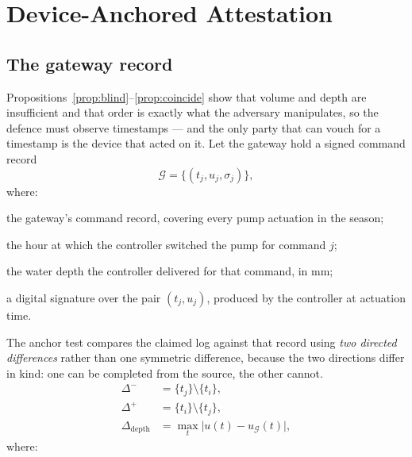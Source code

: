 \section{Device-Anchored Attestation}
\label{sec:anchor}

\subsection{The gateway record}

Propositions~\ref{prop:blind}--\ref{prop:coincide} show that volume and depth
are insufficient and that order is exactly what the adversary manipulates, so
the defence must observe timestamps --- and the only party that can vouch for
a timestamp is the device that acted on it. Let the gateway hold a signed
command record
\begin{equation}
\mathcal{G}=\{(t_j,u_j,\sigma_j)\},
\label{eq:gateway}
\end{equation}
where:
\begin{symbolist}
\item[$\mathcal{G}$] the gateway's command record, covering every pump actuation in the season;
\item[$t_j$] the hour at which the controller switched the pump for command $j$;
\item[$u_j$] the water depth the controller delivered for that command, in mm;
\item[$\sigma_j$] a digital signature over the pair $(t_j,u_j)$, produced by the controller at actuation time.
\end{symbolist} The anchor test compares the claimed log against that record using \emph{two
directed differences} rather than one symmetric difference, because the two
directions differ in kind: one can be completed from the source, the other cannot.
\begin{equation}
\begin{aligned}
\Delta^{-}&=\{t_j\}\setminus\{t_i\},\\
\Delta^{+}&=\{t_i\}\setminus\{t_j\},\\
\Delta_{\mathrm{depth}}&=\max_{t}\bigl|u(t)-u_{\mathcal{G}}(t)\bigr|,
\end{aligned}
\label{eq:deltas}
\end{equation}
where:
